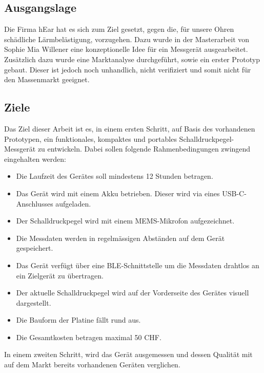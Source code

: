 \documentclass[12pt]{article}
\begin{document}
	\subsection{Ausgangslage} \label{Ausgangslage}
	Die Firma hEar hat es sich zum Ziel gesetzt, gegen die, für unsere Ohren schädliche Lärmbelästigung, vorzugehen. Dazu wurde in der Masterarbeit von Sophie Mia Willener eine konzeptionelle Idee für ein Messgerät ausgearbeitet. Zusätzlich dazu wurde eine Marktanalyse durchgeführt, sowie ein erster Prototyp gebaut. Dieser ist jedoch noch unhandlich, nicht verifiziert und somit nicht für den Massenmarkt geeignet. 
	\subsection{Ziele} \label{Ziele}
	Das Ziel dieser Arbeit ist es, in einem ersten Schritt, auf Basis des vorhandenen Prototypen, ein funktionales, kompaktes und portables Schalldruckpegel-Messgerät zu entwickeln. Dabei sollen folgende Rahmenbedingungen zwingend eingehalten werden:
	\begin{itemize}
		\item Die Laufzeit des Gerätes soll mindestens 12 Stunden betragen.
		\item Das Gerät wird mit einem Akku betrieben. Dieser wird via eines USB-C-Anschlusses aufgeladen.
		\item Der Schalldruckpegel wird mit einem MEMS-Mikrofon aufgezeichnet.
		\item Die Messdaten werden in regelmässigen Abständen auf dem Gerät gespeichert.
		\item Das Gerät verfügt über eine BLE-Schnittstelle um die Messdaten drahtlos an ein Zielgerät zu übertragen.
		\item Der aktuelle Schalldruckpegel wird auf der Vorderseite des Gerätes visuell dargestellt.
		\item Die Bauform der Platine fällt rund aus.
		\item Die Gesamtkosten betragen maximal 50 CHF.
	\end{itemize}
	In einem zweiten Schritt, wird das Gerät ausgemessen und dessen Qualität mit auf dem Markt bereits vorhandenen Geräten verglichen.
\end{document}
